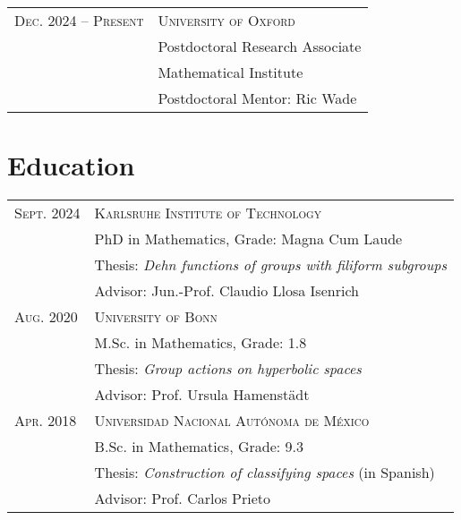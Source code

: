 \documentclass[a4paper,11pt]{article} %
\begin{document}
\begin{longtable}{>{\raggedleft\arraybackslash}p{5cm}p{10cm}}
\textsc{Dec. 2024 -- Present} & \textsc{University of Oxford} \vspace{0.2em} \\
& Postdoctoral Research Associate \\
& Mathematical Institute \\
& \quad Postdoctoral Mentor: Ric Wade
\end{longtable}


\section{Education}

\begin{longtable}{>{\raggedleft\arraybackslash}p{4cm}p{10cm}}
\textsc{Sept.} 2024 & \textsc{Karlsruhe Institute of Technology} \vspace{0.3em} \\
& PhD in Mathematics, Grade: Magna Cum Laude \vspace{0.3em}\\
& \quad Thesis: \emph{Dehn functions of groups with filiform subgroups}\\ 
& \quad Advisor: Jun.-Prof. Claudio Llosa Isenrich \vspace{0.5em}\\

\textsc{Aug.} 2020& \textsc{University of Bonn} \vspace{0.3em}\\
&M.Sc. in Mathematics, Grade: 1.8 \vspace{0.3em}\\
& \quad Thesis: \emph{Group actions on hyperbolic spaces}\\ 
& \quad Advisor: Prof. Ursula Hamenstädt \vspace{0.5em}\\

\textsc{Apr.} 2018& \textsc{Universidad Nacional Autónoma de México} \vspace{0.3em}\\ 
& B.Sc. in Mathematics, Grade: 9.3 \vspace{0.3em}\\
& \quad Thesis: \emph{Construction of classifying spaces} (in Spanish)\\ 
& \quad Advisor: Prof. Carlos Prieto\\
\end{longtable}
\end{document}
